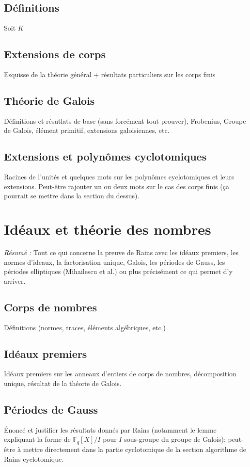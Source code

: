 \documentclass[a4paper]{article} %
\numberwithin{section}{part}
\numberwithin{equation}{section}
\newcommand\GF[1]{\mathbb{F}_{#1}}
\begin{document}
\subsection{Définitions}

Soit $K$ 

\subsection{Extensions de corps}
Esquisse de la théorie général + résultats particuliers sur les corps finis
\subsection{Théorie de Galois}
Définitions et résutlats de base (sans forcément tout prouver), Frobenius, 
Groupe de Galois, élément primitif, extensions galoisiennes, etc.

\subsection{Extensions et polynômes cyclotomiques}
Racines de l'unités et quelques mots sur les polynômes cyclotomiques et leurs 
extensions. Peut-être rajouter un ou deux mots sur le cas des corps finis (ça 
pourrait se mettre dans la section du dessus).

\section{Idéaux et théorie des nombres}
\textit{Résumé :} Tout ce qui concerne la preuve de Rains avec les idéaux 
premiers, les normes d'ideaux, la factorisation unique, Galois, les périodes de 
Gauss, les périodes elliptiques (Mihailescu et al.) ou plus précisément ce qui 
permet d'y arriver.
\subsection{Corps de nombres}
Définitions (normes, traces, éléments algébriques, etc.)
\subsection{Idéaux premiers}
 Idéaux premiers sur les anneaux d'entiers de corps de nombres,
 décomposition unique, résultat de la théorie de Galois.
\subsection{Périodes de Gauss}
Énoncé et justifier les résultats donnés par Rains (notamment le lemme
expliquant la forme de $\GF{q}[X]/I$ pour $I$ sous-groupe du groupe de Galois);
peut-être à mettre directement dans la partie cyclotomique de la section
algorithme de Rains cyclotomique.
\end{document}
